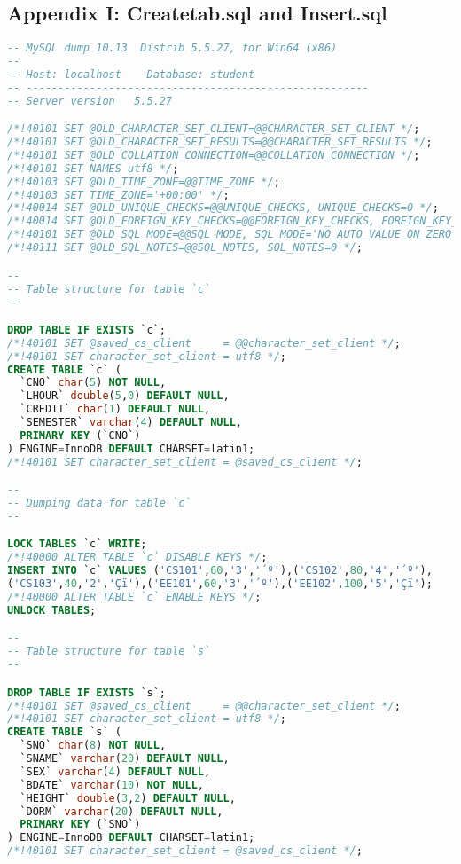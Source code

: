 \documentclass[UTF8]{ctexart}
\begin{document}
    \subsection{Appendix I: Createtab.sql and Insert.sql}
\begin{small}
\begin{lstlisting}[language=sql]
-- MySQL dump 10.13  Distrib 5.5.27, for Win64 (x86)
--
-- Host: localhost    Database: student
-- ------------------------------------------------------
-- Server version	5.5.27

/*!40101 SET @OLD_CHARACTER_SET_CLIENT=@@CHARACTER_SET_CLIENT */;
/*!40101 SET @OLD_CHARACTER_SET_RESULTS=@@CHARACTER_SET_RESULTS */;
/*!40101 SET @OLD_COLLATION_CONNECTION=@@COLLATION_CONNECTION */;
/*!40101 SET NAMES utf8 */;
/*!40103 SET @OLD_TIME_ZONE=@@TIME_ZONE */;
/*!40103 SET TIME_ZONE='+00:00' */;
/*!40014 SET @OLD_UNIQUE_CHECKS=@@UNIQUE_CHECKS, UNIQUE_CHECKS=0 */;
/*!40014 SET @OLD_FOREIGN_KEY_CHECKS=@@FOREIGN_KEY_CHECKS, FOREIGN_KEY_CHECKS=0 */;
/*!40101 SET @OLD_SQL_MODE=@@SQL_MODE, SQL_MODE='NO_AUTO_VALUE_ON_ZERO' */;
/*!40111 SET @OLD_SQL_NOTES=@@SQL_NOTES, SQL_NOTES=0 */;

--
-- Table structure for table `c`
--

DROP TABLE IF EXISTS `c`;
/*!40101 SET @saved_cs_client     = @@character_set_client */;
/*!40101 SET character_set_client = utf8 */;
CREATE TABLE `c` (
  `CNO` char(5) NOT NULL,
  `LHOUR` double(5,0) DEFAULT NULL,
  `CREDIT` char(1) DEFAULT NULL,
  `SEMESTER` varchar(4) DEFAULT NULL,
  PRIMARY KEY (`CNO`)
) ENGINE=InnoDB DEFAULT CHARSET=latin1;
/*!40101 SET character_set_client = @saved_cs_client */;

--
-- Dumping data for table `c`
--

LOCK TABLES `c` WRITE;
/*!40000 ALTER TABLE `c` DISABLE KEYS */;
INSERT INTO `c` VALUES ('CS101',60,'3','´º'),('CS102',80,'4','´º'),
('CS103',40,'2','Çï'),('EE101',60,'3','´º'),('EE102',100,'5','Çï');
/*!40000 ALTER TABLE `c` ENABLE KEYS */;
UNLOCK TABLES;

--
-- Table structure for table `s`
--

DROP TABLE IF EXISTS `s`;
/*!40101 SET @saved_cs_client     = @@character_set_client */;
/*!40101 SET character_set_client = utf8 */;
CREATE TABLE `s` (
  `SNO` char(8) NOT NULL,
  `SNAME` varchar(20) DEFAULT NULL,
  `SEX` varchar(4) DEFAULT NULL,
  `BDATE` varchar(10) NOT NULL,
  `HEIGHT` double(3,2) DEFAULT NULL,
  `DORM` varchar(20) DEFAULT NULL,
  PRIMARY KEY (`SNO`)
) ENGINE=InnoDB DEFAULT CHARSET=latin1;
/*!40101 SET character_set_client = @saved_cs_client */;


\end{lstlisting}
\end{small}
\end{document}
